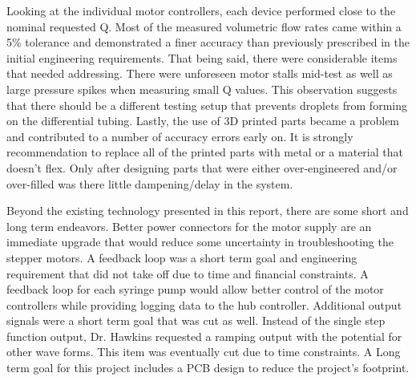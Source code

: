\documentclass[journal]{IEEEtran}
\begin{document}
    Looking at the individual motor controllers, each device performed close to the nominal requested Q. Most of the measured volumetric flow rates came within a 5\% tolerance and demonstrated a finer accuracy than previously prescribed in the initial engineering requirements. That being said, there were considerable items that needed addressing. There were unforeseen motor stalls mid-test as well as large pressure spikes when measuring small Q values. This observation suggests that there should be a different testing setup that prevents droplets from forming on the differential tubing. Lastly, the use of 3D printed parts became a problem and contributed to a number of accuracy errors early on. It is strongly recommendation to replace all of the printed parts with metal or a material that doesn't flex. Only after designing parts that were either over-engineered and/or over-filled was there little dampening/delay in the system.
    
    Beyond the existing technology presented in this report, there are some short and long term endeavors. Better power connectors for the motor supply are an immediate upgrade that would reduce some uncertainty in troubleshooting the stepper motors. A feedback loop was a short term goal and engineering requirement that did not take off due to time and financial constraints. A feedback loop for each syringe pump would allow better control of the motor controllers while providing logging data to the hub controller. Additional output signals were a short term goal that was cut as well. Instead of the single step function output, Dr. Hawkins requested a ramping output with the potential for other wave forms. This item was eventually cut due to time constraints. A Long term goal for this project includes a PCB design to reduce the project's footprint.
    





%
\end{document}
